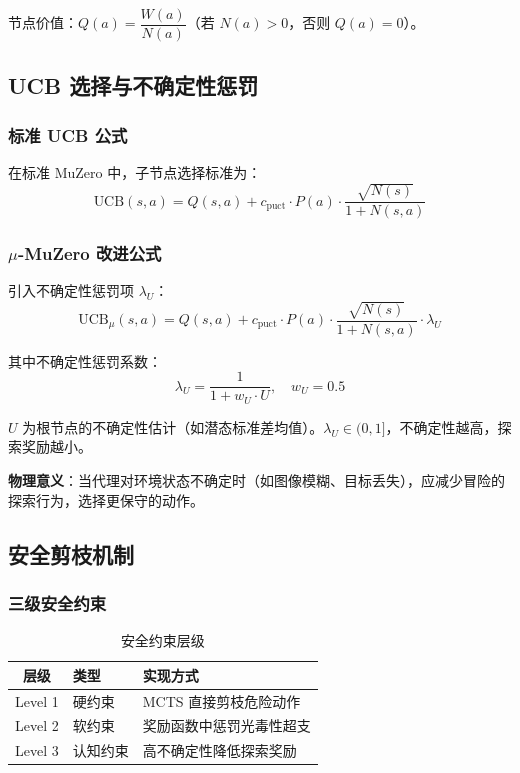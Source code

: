 \documentclass[UTF8, a4paper]{ctexart}
\begin{document}
节点价值：$Q(a) = \dfrac{W(a)}{N(a)}$（若 $N(a) > 0$，否则 $Q(a) = 0$）。

\subsection{UCB 选择与不确定性惩罚}

\subsubsection{标准 UCB 公式}

在标准 MuZero 中，子节点选择标准为：
\begin{equation}
\text{UCB}(s, a) = Q(s, a) + c_{\text{puct}} \cdot P(a) \cdot \frac{\sqrt{N(s)}}{1 + N(s, a)}
\end{equation}

\subsubsection{$\mu$-MuZero 改进公式}

引入不确定性惩罚项 $\lambda_U$：
\begin{equation}
\boxed{\text{UCB}_\mu(s, a) = Q(s, a) + c_{\text{puct}} \cdot P(a) \cdot \frac{\sqrt{N(s)}}{1 + N(s, a)} \cdot \lambda_U}
\end{equation}

其中不确定性惩罚系数：
\begin{equation}
\lambda_U = \frac{1}{1 + w_U \cdot U}, \quad w_U = 0.5
\end{equation}

$U$ 为根节点的不确定性估计（如潜态标准差均值）。$\lambda_U \in (0, 1]$，不确定性越高，探索奖励越小。

\textbf{物理意义}：当代理对环境状态不确定时（如图像模糊、目标丢失），应减少冒险的探索行为，选择更保守的动作。

\subsection{安全剪枝机制}

\subsubsection{三级安全约束}

\begin{table}[H]
\centering
\caption{安全约束层级}
\begin{tabular}{@{}cll@{}}
\toprule
\textbf{层级} & \textbf{类型} & \textbf{实现方式} \\
\midrule
Level 1 & 硬约束 & MCTS 直接剪枝危险动作 \\
Level 2 & 软约束 & 奖励函数中惩罚光毒性超支 \\
Level 3 & 认知约束 & 高不确定性降低探索奖励 \\
\bottomrule
\end{tabular}
\end{table}
\end{document}
